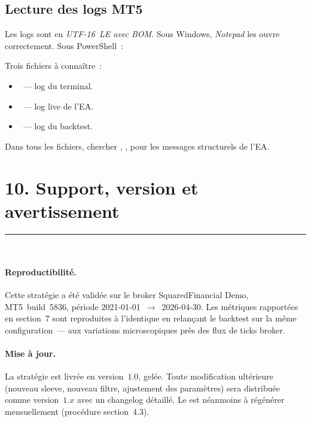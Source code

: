 \documentclass[11pt, a4paper]{scrartcl}
\begin{document}
\subsection*{Lecture des logs MT5}

Les logs sont en \emph{UTF-16~LE avec BOM}. Sous Windows, \emph{Notepad} les
ouvre correctement. Sous PowerShell~:
\begin{center}
\small{}
\end{center}

Trois fichiers à connaître~:
\begin{itemize}
\item {}~--- log du terminal.
\item {}~--- log live de l'EA.
\item {}~--- log du backtest.
\end{itemize}

Dans tous les fichiers, chercher \code{[INIT]}, \code{[ERROR]}, \code{[DEINIT]}
pour les messages structurels de l'EA.


\section*{10. Support, version et avertissement}
\vspace{-0.4em}
{\color{accent}\rule{\linewidth}{1.0pt}}\\[0.4em]

\paragraph{Reproductibilité.} Cette stratégie a été validée sur le
broker SquaredFinancial Demo, MT5~build~5836, période 2021-01-01~$\rightarrow$~2026-04-30.
Les métriques rapportées en section~7 sont reproduites à l'identique en relançant
le backtest sur la même configuration~--- aux variations microscopiques près
des flux de ticks broker.

\paragraph{Mise à jour.} La stratégie est livrée en version~$1.0$, gelée.
Toute modification ultérieure (nouveau sleeve, nouveau filtre, ajustement
des paramètres) sera distribuée comme version~$1.x$ avec un changelog
détaillé. Le  est néanmoins à régénérer
mensuellement (procédure section~4.3).
\end{document}
